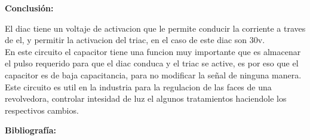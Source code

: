 \documentclass[letterpaper]{article}
\begin{document}
   
    

\begin{LARGE}
\textbf{Conclusión:}\\
\end{LARGE}
\begin{large}
    El diac tiene un voltaje de activacion que le permite conducir la corriente a traves de el, y permitir la activacion del triac, en el caso de este diac son 30v.\\
    En este circuito el capacitor tiene una funcion muy importante que es almacenar el pulso requerido para que el diac conduca y el triac se active, es por eso que el capacitor es de baja capacitancia, para no modificar la señal de ninguna manera.\\
    Este circuito es util en la industria para la regulacion de las faces de una revolvedora, controlar intesidad de luz el algunos tratamientos haciendole los respectivos cambios.\\
\end{large}





\begin{LARGE}
\textbf{Bibliografía:}\\
\end{LARGE}
\end{document}
